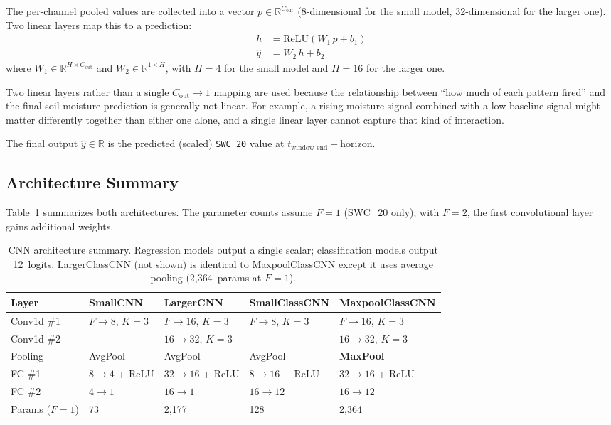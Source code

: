 \documentclass[11pt]{article}
\begin{document}
The per-channel pooled values are collected into a vector
$p \in \mathbb{R}^{C_{\text{out}}}$ (8-dimensional for the small model,
32-dimensional for the larger one). Two linear layers map this to a prediction:
\begin{align}
    h &= \text{ReLU}(W_1 \, p + b_1) \\
    \hat{y} &= W_2 \, h + b_2
\end{align}
where $W_1 \in \mathbb{R}^{H \times C_{\text{out}}}$ and
$W_2 \in \mathbb{R}^{1 \times H}$, with $H = 4$ for the small model and $H = 16$
for the larger one.

Two linear layers rather than a single $C_{\text{out}} \to 1$ mapping are used
because the relationship between ``how much of each pattern fired'' and the final
soil-moisture prediction is generally not linear. For example, a rising-moisture
signal combined with a low-baseline signal might matter differently together than
either one alone, and a single linear layer cannot capture that kind of interaction.

The final output $\hat{y} \in \mathbb{R}$ is the predicted (scaled) \texttt{SWC\_20}
value at $t_{\text{window\_end}} + \text{horizon}$.

\subsection{Architecture Summary}

Table~\ref{tab:arch} summarizes both architectures. The parameter counts assume $F=1$
(SWC\_20 only); with $F=2$, the first convolutional layer gains additional weights.

\begin{table}[h]
\centering
\caption{CNN architecture summary. Regression models output a single scalar;
classification models output 12~logits. LargerClassCNN (not shown) is identical
to MaxpoolClassCNN except it uses average pooling (2{,}364~params at $F\!=\!1$).}
\label{tab:arch}
\begin{tabular}{lllll}
\toprule
\textbf{Layer} & \textbf{SmallCNN} & \textbf{LargerCNN}
    & \textbf{SmallClassCNN} & \textbf{MaxpoolClassCNN} \\
\midrule
Conv1d \#1 & $F \to 8$, $K=3$ & $F \to 16$, $K=3$
    & $F \to 8$, $K=3$ & $F \to 16$, $K=3$ \\
Conv1d \#2 & --- & $16 \to 32$, $K=3$
    & --- & $16 \to 32$, $K=3$ \\
Pooling & AvgPool & AvgPool & AvgPool & \textbf{MaxPool} \\
FC \#1 & $8 \to 4$ + ReLU & $32 \to 16$ + ReLU
    & $8 \to 16$ + ReLU & $32 \to 16$ + ReLU \\
FC \#2 & $4 \to 1$ & $16 \to 1$
    & $16 \to 12$ & $16 \to 12$ \\
\midrule
Params ($F\!=\!1$) & 73 & 2{,}177 & 128 & 2{,}364 \\
\bottomrule
\end{tabular}
\end{table}
\end{document}
